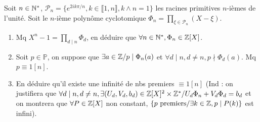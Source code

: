 \begin{statementbox}
Soit $n \in \mathbb N^*$, $\mathcal{P}_n = \{e^{2ik\pi/n}, k \in \llbracket 1, n \rrbracket, k \wedge n = 1\}$ les racines primitives $n$-ièmes de l'unité.
Soit le $n$-ième polynôme cyclotomique $\Phi_n = \prod_{\xi \in \mathcal{P}_n} (X - \xi)$.
\begin{enumerate}[label=\alph*)]
  \item Mq $X^n - 1 = \prod_{d \mid n} \Phi_d$, en déduire que $\forall n \in \mathbb N^*, \Phi_n \in \mathbb Z[X]$.
  \item Soit $p \in \mathbb{P}$, on suppose que $\exists a \in \mathbb Z / p \mid \Phi_n(a)$ et $\forall d \mid n, d \neq n, p \nmid \Phi_d(a)$. Mq $p \equiv 1 [n]$.
  \item En déduire qu'il existe une infinité de nbs premiers $\equiv 1 [n]$ (Ind : on justifiera que $\forall d \mid n, d \neq n, \exists (U_d, V_d, b_d) \in \mathbb Z[X]^2 \times \mathbb Z^* / U_d \Phi_n + V_d \Phi_d = b_d$ et on montrera que $\forall P \in \mathbb Z[X]$ non constant, $\{p \text{ premiers} / \exists k \in \mathbb Z, p \mid P(k)\}$ est infini).
\end{enumerate}
\end{statementbox}

